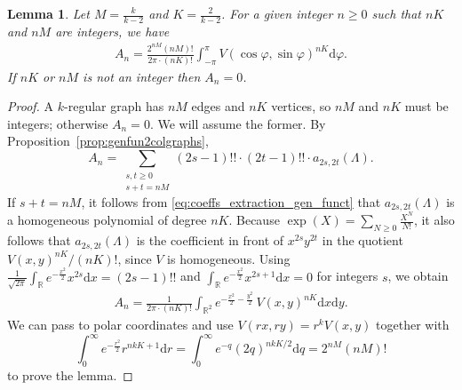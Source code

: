 \documentclass[english]{ourlematemasingle}
\numberwithin{theorem}{section}
\newtheorem{lemma}[theorem]{Lemma}
\theoremstyle{remark}
\newcommand{\R}{\mathbb{R}}
\newcommand{\dd}{\mathrm{d}}
\newcommand{\ol}{\Lambda}
\begin{document}
\begin{lemma}
\label{lmm:AnHomo}
Let $M = \frac{k}{k-2}$ and $K=\frac{2}{k-2}$.
For a given integer $n \geq 0$ such that $nK$ and $nM$ are integers, we have
\begin{gather*}
A_n = \frac{2^{nM} (nM)! }{ 2\pi \cdot (nK)!} 
\int_{-\pi}^\pi  V(\cos\varphi ,\sin \varphi)^{nK} \dd \varphi.
\end{gather*}
If $nK$ or $nM$ is not an integer then $A_n =0$.
\end{lemma}
\begin{proof}
A $k$-regular graph
has $nM$ edges and $nK$ vertices, so
$nM$ and $nK$ must be integers; otherwise $A_n =0$. We
will assume the former.
By Proposition~\ref{prop:genfun2colgraphs},
$$
A_n = \sum_{\substack{s,t\geq 0\\ s+t=nM}} 
(2s-1)!! \cdot (2t-1)!! \cdot a_{2s,2t}(\ol).
$$
If $s+t = nM$, it follows from \eqref{eq:coeffs_extraction_gen_funct} that $a_{2s,2t}(\Lambda)$ is a homogeneous polynomial  of degree $nK$. Because $\exp(X) = \sum_{N \geq 0} \frac{X^N}{N!}$, it also follows that $a_{2s,2t}(\Lambda)$ is the coefficient in front of $x^{2s}y^{2t}$ in the quotient $V(x,y)^{nK}/(nK)!$, since $V$ is homogeneous.
Using $\frac{1}{\sqrt{ 2\pi} }\int_\R e^{-\frac{x^2}{2}} x^{2s}\dd x = (2s-1)!!$ and $\int_\R e^{-\frac{x^2}{2}} x^{2s+1}\dd x = 0$ for integers $s$, we obtain 
\begin{gather*}
A_n = \frac{1}{2\pi \cdot (nK)!} 
\int_{\R^2} e^{-\frac{x^2}{2} - \frac{y^2}{2} }\, V(x,y)^{nK} \dd x \dd y.
\end{gather*}
We can pass to polar coordinates and use $V(rx,ry) = r^k V(x,y)$ together with 
$$
\int_0^\infty e^{-\frac{r^2}{2}} r^{nkK+1} \dd r =
\int_0^\infty e^{-q} (2q)^{nkK/2} \dd q = 2^{nM} (nM)!
$$
to prove the lemma.
\end{proof}
\end{document}
